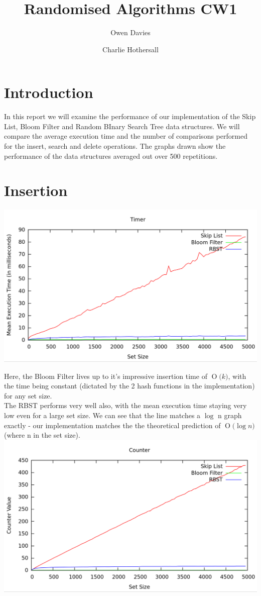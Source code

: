 \documentclass[11pt, notitlepage]{report}
\title{Randomised Algorithms CW1}
\date{}
\author{Owen Davies \and Charlie Hothersall}
\newcommand{\BigO}[1]{\ensuremath{\operatorname{O}\bigl(#1\bigr)}}
\begin{document}
\maketitle

\section*{Introduction}

In this report we will examine the performance of our implementation of the Skip List, Bloom Filter and Random BInary Search Tree data structures. We will compare the average execution time and the number of comparisons performed for the insert, search and delete operations. The graphs drawn show the performance of the data structures averaged out over 500 repetitions.

\section*{Insertion}

\includegraphics[width=\linewidth]{img/Timer-Add}

Here, the Bloom Filter lives up to it's impressive insertion time of \BigO{k}, with the time being constant (dictated by the 2 hash functions in the implementation) for any set size.\\

The RBST performs very well also, with the mean execution time staying very low even for a large set size. We can see that the line matches a $\log$ n graph exactly - our implementation matches the the theoretical prediction of \BigO{\log n} (where n in the set size).\\


\includegraphics[width=\linewidth]{img/Counter-Add}
\end{document}
